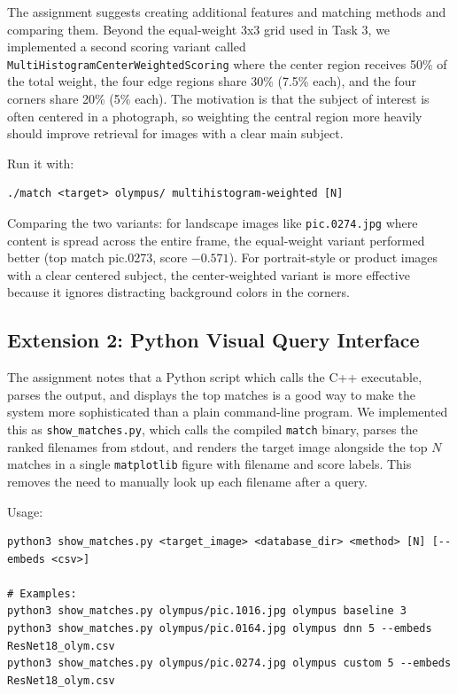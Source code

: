 \documentclass[11pt,letterpaper]{article}
\begin{document}
The assignment suggests creating additional features and matching methods and comparing
them. Beyond the equal-weight 3x3 grid used in Task 3, we implemented a second scoring
variant called \texttt{MultiHistogramCenterWeightedScoring} where the center
region receives 50\% of the total weight, the four edge regions share 30\% (7.5\%
each), and the four corners share 20\% (5\% each). The motivation is that the
subject of interest is often centered in a photograph, so weighting the central
region more heavily should improve retrieval for images with a clear main subject.

Run it with:
\begin{verbatim}
./match <target> olympus/ multihistogram-weighted [N]
\end{verbatim}

Comparing the two variants: for landscape images like \texttt{pic.0274.jpg} where
content is spread across the entire frame, the equal-weight variant performed better
(top match pic.0273, score $-0.571$). For portrait-style or product images with a
clear centered subject, the center-weighted variant is more effective because it
ignores distracting background colors in the corners.

\subsection*{Extension 2: Python Visual Query Interface}

The assignment notes that a Python script which calls the C++ executable, parses
the output, and displays the top matches is a good way to make the system more
sophisticated than a plain command-line program. We implemented this as
\texttt{show\_matches.py}, which calls the compiled \texttt{match} binary,
parses the ranked filenames from stdout, and renders the target image alongside
the top $N$ matches in a single \texttt{matplotlib} figure with filename and
score labels. This removes the need to manually look up each filename after a query.

Usage:
\begin{verbatim}
python3 show_matches.py <target_image> <database_dir> <method> [N] [--embeds <csv>]

# Examples:
python3 show_matches.py olympus/pic.1016.jpg olympus baseline 3
python3 show_matches.py olympus/pic.0164.jpg olympus dnn 5 --embeds ResNet18_olym.csv
python3 show_matches.py olympus/pic.0274.jpg olympus custom 5 --embeds ResNet18_olym.csv
\end{verbatim}
\end{document}
